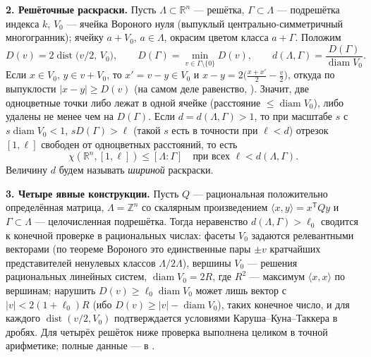 \documentclass{article}
\newcommand{\R}{\mathbb{R}}
\newcommand{\Z}{\mathbb{Z}}
\newcommand{\diam}{\operatorname{diam}}
\newcommand{\dist}{\operatorname{dist}}
\begin{document}
\textbf{2. Решёточные раскраски.}
Пусть $\Lambda\subset\R^n$ --- решётка, $\Gamma\subset\Lambda$ --- подрешётка
индекса $k$, $V_0$ --- ячейка Вороного нуля (выпуклый центрально-симметричный
многогранник); ячейку $a+V_0$, $a\in\Lambda$, окрасим цветом класса $a+\Gamma$.
Положим
\[
D(v)=2\dist\bigl(v/2,\,V_0\bigr),\qquad
D(\Gamma)=\min_{v\in\Gamma\setminus\{0\}}D(v),\qquad
d(\Lambda,\Gamma)=\frac{D(\Gamma)}{\diam V_0}.
\]
Если $x\in V_0$, $y\in v+V_0$, то $x'=v-y\in V_0$ и
$x-y=2\bigl(\tfrac{x+x'}2-\tfrac v2\bigr)$, откуда по выпуклости
$|x-y|\ge D(v)$ (на самом деле равенство, \cite[лемма~2]{Ivanov2011}). Значит,
две одноцветные точки либо лежат в одной ячейке (расстояние $\le\diam V_0$),
либо удалены не менее чем на $D(\Gamma)$. Если $d=d(\Lambda,\Gamma)>1$, то при
масштабе $s$ с $s\diam V_0<1$, $sD(\Gamma)>\ell$ (такой $s$ есть в точности при
$\ell<d$) отрезок $[1,\ell]$ свободен от одноцветных расстояний, то есть
\begin{equation}\label{crit}
\chi(\R^n,[1,\ell])\le[\Lambda:\Gamma]\quad\text{при всех }\ell<d(\Lambda,\Gamma).
\end{equation}
Величину $d$ будем называть \emph{шириной} раскраски.

\textbf{3. Четыре явные конструкции.}
Пусть $Q$ --- рациональная положительно определённая матрица, $\Lambda=\Z^n$
со скалярным произведением $\langle x,y\rangle=x^{\mathsf T}Qy$ и
$\Gamma\subset\Lambda$ --- целочисленная подрешётка. Тогда неравенство
$d(\Lambda,\Gamma)>\ell_0$ сводится к конечной проверке в рациональных числах:
фасеты $V_0$ задаются релевантными векторами (по теореме Вороного это
единственные пары $\pm v$ кратчайших представителей ненулевых классов
$\Lambda/2\Lambda$), вершины $V_0$ --- решения рациональных линейных систем,
$\diam V_0=2R$, где $R^2$ --- максимум $\langle x,x\rangle$ по вершинам;
нарушить $D(v)\ge\ell_0\diam V_0$ может лишь вектор с $|v|<2(1+\ell_0)R$
(ибо $D(v)\ge|v|-\diam V_0$), таких конечное число, и для каждого
$\dist(v/2,V_0)$ подтверждается условиями Каруша--Куна--Таккера в дробях.
Для четырёх решёток ниже проверка выполнена целиком в точной арифметике;
полные данные --- в \cite{Full}.
\end{document}
